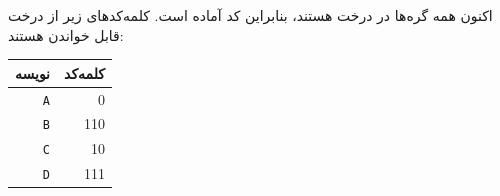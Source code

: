 اکنون همه گره‌ها در درخت هستند، بنابراین کد آماده است.
کلمه‌کدهای زیر از درخت قابل خواندن هستند:
\begin{center}
\begin{tabular}{rr}
نویسه & کلمه‌کد \\
\hline
\texttt{A} & 0 \\
\texttt{B} & 110 \\
\texttt{C} & 10 \\
\texttt{D} & 111 \\
\end{tabular}
\end{center}